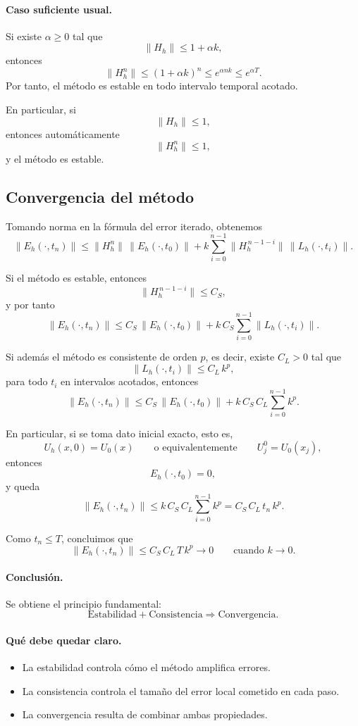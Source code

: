 \paragraph{Caso suficiente usual.}
Si existe \(\alpha\ge 0\) tal que
\[
\|H_h\|\le 1+\alpha k,
\]
entonces
\[
\|H_h^n\|
\le
(1+\alpha k)^n
\le
e^{\alpha nk}
\le
e^{\alpha T}.
\]
Por tanto, el método es estable en todo intervalo temporal acotado.

\begin{observacion}
En particular, si
\[
\|H_h\|\le 1,
\]
entonces automáticamente
\[
\|H_h^n\|\le 1,
\]
y el método es estable.
\end{observacion}

\subsection{Convergencia del método}

Tomando norma en la fórmula del error iterado, obtenemos
\[
\|E_h(\cdot,t_n)\|
\le
\|H_h^n\|\,\|E_h(\cdot,t_0)\|
+
k\sum_{i=0}^{n-1}
\|H_h^{\,n-1-i}\|\,\|L_h(\cdot,t_i)\|.
\]

Si el método es estable, entonces
\[
\|H_h^{\,n-1-i}\|\le C_S,
\]
y por tanto
\[
\|E_h(\cdot,t_n)\|
\le
C_S\,\|E_h(\cdot,t_0)\|
+
k\,C_S\sum_{i=0}^{n-1}\|L_h(\cdot,t_i)\|.
\]

Si además el método es consistente de orden \(p\), es decir, existe \(C_L>0\) tal que
\[
\|L_h(\cdot,t_i)\|\le C_L\,k^p,
\]
para todo \(t_i\) en intervalos acotados, entonces
\[
\|E_h(\cdot,t_n)\|
\le
C_S\,\|E_h(\cdot,t_0)\|
+
k\,C_S\,C_L\sum_{i=0}^{n-1}k^p.
\]

En particular, si se toma dato inicial exacto, esto es,
\[
U_h(x,0)=U_0(x)
\qquad \text{o equivalentemente} \qquad
U_j^0=U_0(x_j),
\]
entonces
\[
E_h(\cdot,t_0)=0,
\]
y queda
\[
\|E_h(\cdot,t_n)\|
\le
k\,C_S\,C_L\sum_{i=0}^{n-1}k^p
=
C_S\,C_L\,t_n\,k^p.
\]

Como \(t_n\le T\), concluimos que
\[
\|E_h(\cdot,t_n)\|
\le
C_S\,C_L\,T\,k^p
\longrightarrow 0
\qquad \text{cuando } k\to 0.
\]

\paragraph{Conclusión.}
Se obtiene el principio fundamental:
\[
\boxed{\text{Estabilidad}+\text{Consistencia}\Longrightarrow \text{Convergencia}.}
\]

\paragraph{Qué debe quedar claro.}
\begin{itemize}
    \item La estabilidad controla cómo el método amplifica errores.
    \item La consistencia controla el tamaño del error local cometido en cada paso.
    \item La convergencia resulta de combinar ambas propiedades.
\end{itemize}


